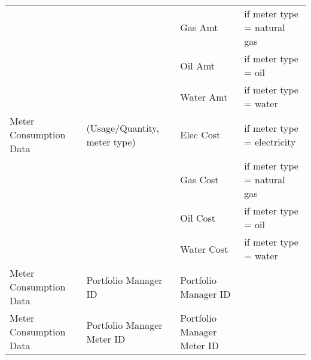 \documentclass[12pt]{article}
\begin{document}
\begin{table}[h!]
\begin{tabular}{ll|l|l}
                       &                              & Gas Amt                     & if meter type = natural gas \\
                       &                              & Oil Amt                     & if meter type = oil         \\
                       &                              & Water Amt                   & if meter type = water       \\
Meter Consumption Data & (Usage/Quantity, meter type) & Elec Cost                    & if meter type = electricity \\
                       &                              & Gas Cost                     & if meter type = natural gas \\
                       &                              & Oil Cost                     & if meter type = oil         \\
                       &                              & Water Cost                   & if meter type = water       \\
Meter Consumption Data & Portfolio Manager ID         & Portfolio Manager ID        &                             \\
Meter Consumption Data & Portfolio Manager Meter ID   & Portfolio Manager Meter ID  &                             \\
  \hline
\end{tabular}
\end{table}
\newpage


\end{document}

